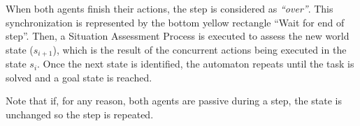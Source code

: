 When both agents finish their actions, the step is considered as \textit{``over''}. This synchronization is represented by the bottom yellow rectangle ``Wait for end of step''. Then, a Situation Assessment Process is executed to assess the new world state ($s_{i+1}$), which is the result of the concurrent actions being executed in the state $s_i$. Once the next state is identified, the automaton repeats until the task is solved and a goal state is reached.

Note that if, for any reason, both agents are passive during a step, the state is unchanged so the step is repeated. 




